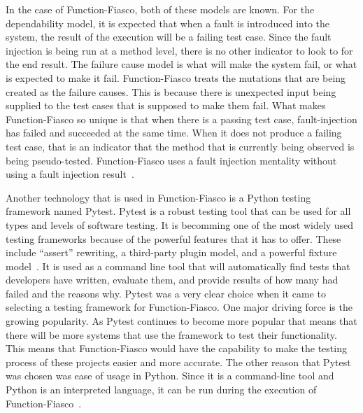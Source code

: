 In the case of Function-Fiasco, both of these models are known. For the dependability model, it is expected that when a fault is introduced into the system, the result of the execution will be a failing test case. Since the fault injection is being run at a method level, there is no other indicator to look to for the end result. The failure cause model is what will make the system fail, or what is expected to make it fail. Function-Fiasco treats the mutations that are being created as the failure causes. This is because there is unexpected input being supplied to the test cases that is supposed to make them fail. What makes Function-Fiasco so unique is that when there is a passing test case, fault-injection has failed and succeeded at the same time. When it does not produce a failing test case, that is an indicator that the method that is currently being observed is being pseudo-tested. Function-Fiasco uses a fault injection mentality without using a fault injection result~\cite{feinbube2018software}.

Another technology that is used in Function-Fiasco is a Python testing framework named Pytest. Pytest is a robust testing tool that can be used for all types and levels of software testing. It is becomming one of the most widely used testing frameworks because of the powerful features that it has to offer. These include ``assert'' rewriting, a third-party plugin model, and a powerful fixture model~\cite{okken_2018}. It is used as a command line tool that will automatically find tests that developers have written, evaluate them, and provide results of how many had failed and the reasons why. Pytest was a very clear choice when it came to selecting a testing framework for Function-Fiasco. One major driving force is the growing popularity. As Pytest continues to become more popular that means that there will be more systems that use the framework to test their functionality. This means that Function-Fiasco would have the capability to make the testing process of these projects easier and more accurate. The other reason that Pytest was chosen was ease of usage in Python. Since it is a command-line tool and Python is an interpreted language, it can be run during the execution of Function-Fiasco~\cite{okken_2018}.

